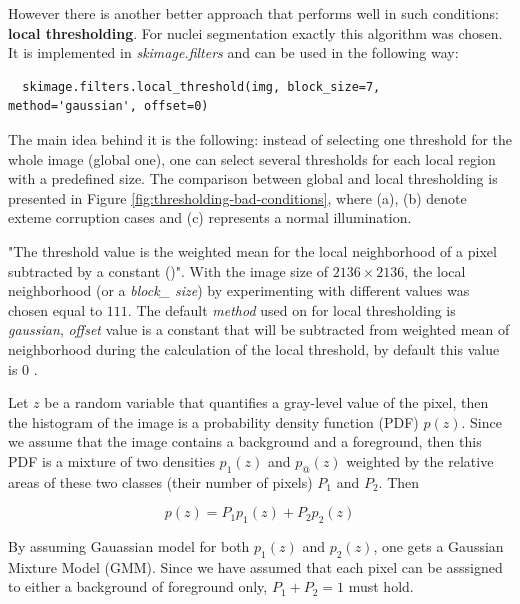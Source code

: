 However there is another better approach that performs well in such conditions: \textbf{local thresholding}. For nuclei segmentation exactly this algorithm was chosen. It is implemented in \textit{skimage.filters} and can be used in the following way:

\begin{lstlisting}
  skimage.filters.local_threshold(img, block_size=7, method='gaussian', offset=0)
\end{lstlisting}

The main idea behind it is the following: instead of selecting one threshold for the whole image (global one), one can select several thresholds for each local region with a predefined size. The comparison between global and local thresholding is presented in Figure \ref{fig:thresholding-bad-conditions}, where (a), (b) denote exteme corruption cases and (c) represents a normal illumination.

"The threshold value is the weighted mean for the local neighborhood of a pixel subtracted by a constant (\cite{digital_image_book})". With the image size of $2136 \times 2136$, the local neighborhood (or a \textit{block\_ size}) by experimenting with different values was chosen equal to $111$. The default \textit{method} used on for local thresholding is \textit{gaussian}, \textit{offset} value is a constant that will be subtracted from weighted mean of neighborhood during the calculation of the local threshold, by default this value is $0$ \cite{local_thresholding}.

Let $z$ be a random variable that quantifies a gray-level value of the pixel, then the histogram of the image is a probability density function (PDF) $p(z)$. Since we assume that the image contains a background and a foreground, then this PDF is a mixture of two densities $p_1(z)$ and $p_@(z)$ weighted by the relative areas of these two classes (their number of pixels) $P_1$ and $P_2$. Then 

\begin{equation}
    p(z) = P_1 p_1(z) + P_2 p_2(z)
\end{equation}

By assuming Gauassian model for both $p_1(z)$ and $p_2(z)$, one gets a Gaussian Mixture Model (GMM). Since we have assumed that each pixel can be asssigned to either a background of foreground only, $P_1 + P_2 = 1$ must hold. 

